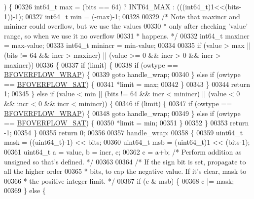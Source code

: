 \begin{DoxyCode}
      ) \{
00326     int64\_t max = (bits == 64) ? INT64\_MAX : (((int64\_t)1<<(bits-1))-1);
00327     int64\_t min = (-max)-1;
00328 
00329     \textcolor{comment}{/* Note that maxincr and minincr could overflow, but we use the values}
00330 \textcolor{comment}{     * only after checking 'value' range, so when we use it no overflow}
00331 \textcolor{comment}{     * happens. */}
00332     int64\_t maxincr = max-value;
00333     int64\_t minincr = min-value;
00334 
00335     \textcolor{keywordflow}{if} (value > max || (bits != 64 && incr > maxincr) || (value >= 0 && incr > 0 && incr > maxincr))
00336     \{
00337         \textcolor{keywordflow}{if} (limit) \{
00338             \textcolor{keywordflow}{if} (owtype == \hyperlink{bitops_8c_a4ecdfa50fecb0c7c8f11f098d9b808e8}{BFOVERFLOW\_WRAP}) \{
00339                 \textcolor{keywordflow}{goto} handle\_wrap;
00340             \} \textcolor{keywordflow}{else} \textcolor{keywordflow}{if} (owtype == \hyperlink{bitops_8c_abe656810f7c24542b4451c96b960cae1}{BFOVERFLOW\_SAT}) \{
00341                 *limit = max;
00342             \}
00343         \}
00344         \textcolor{keywordflow}{return} 1;
00345     \} \textcolor{keywordflow}{else} \textcolor{keywordflow}{if} (value < min || (bits != 64 && incr < minincr) || (value < 0 && incr < 0 && incr < 
      minincr)) \{
00346         \textcolor{keywordflow}{if} (limit) \{
00347             \textcolor{keywordflow}{if} (owtype == \hyperlink{bitops_8c_a4ecdfa50fecb0c7c8f11f098d9b808e8}{BFOVERFLOW\_WRAP}) \{
00348                 \textcolor{keywordflow}{goto} handle\_wrap;
00349             \} \textcolor{keywordflow}{else} \textcolor{keywordflow}{if} (owtype == \hyperlink{bitops_8c_abe656810f7c24542b4451c96b960cae1}{BFOVERFLOW\_SAT}) \{
00350                 *limit = min;
00351             \}
00352         \}
00353         \textcolor{keywordflow}{return} -1;
00354     \}
00355     \textcolor{keywordflow}{return} 0;
00356 
00357 handle\_wrap:
00358     \{
00359         uint64\_t mask = ((uint64\_t)-1) << bits;
00360         uint64\_t msb = (uint64\_t)1 << (bits-1);
00361         uint64\_t a = value, b = incr, c;
00362         c = a+b; \textcolor{comment}{/* Perform addition as unsigned so that's defined. */}
00363 
00364         \textcolor{comment}{/* If the sign bit is set, propagate to all the higher order}
00365 \textcolor{comment}{         * bits, to cap the negative value. If it's clear, mask to}
00366 \textcolor{comment}{         * the positive integer limit. */}
00367         \textcolor{keywordflow}{if} (c & msb) \{
00368             c |= mask;
00369         \} \textcolor{keywordflow}{else} \{

\end{DoxyCode}
